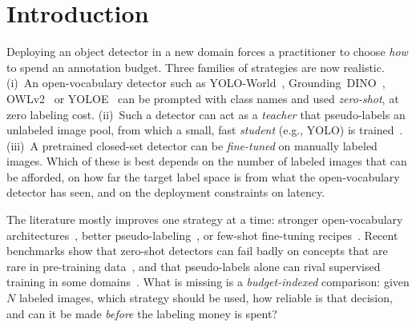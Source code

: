 \documentclass[conference]{IEEEtran}
\begin{document}
\section{Introduction}
Deploying an object detector in a new domain forces a practitioner to choose \emph{how} to spend an annotation budget. Three families of strategies are now realistic. (i)~An open-vocabulary detector such as YOLO-World~\cite{cheng2024yoloworld}, Grounding~DINO~\cite{liu2024groundingdino}, OWLv2~\cite{minderer2023owlv2} or YOLOE~\cite{wang2025yoloe} can be prompted with class names and used \emph{zero-shot}, at zero labeling cost. (ii)~Such a detector can act as a \emph{teacher} that pseudo-labels an unlabeled image pool, from which a small, fast \emph{student} (e.g., YOLO) is trained~\cite{son2024teacherstudent,xin2024dart}. (iii)~A pretrained closed-set detector can be \emph{fine-tuned} on manually labeled images. Which of these is best depends on the number of labeled images that can be afforded, on how far the target label space is from what the open-vocabulary detector has seen, and on the deployment constraints on latency.

The literature mostly improves one strategy at a time: stronger open-vocabulary architectures~\cite{cheng2024yoloworld,liu2024groundingdino,minderer2023owlv2,wang2025yoloe}, better pseudo-labeling~\cite{gao2022pseudobox,liu2021unbiased,xu2021softteacher}, or few-shot fine-tuning recipes~\cite{wang2020tfa}. Recent benchmarks show that zero-shot detectors can fail badly on concepts that are rare in pre-training data~\cite{robicheaux2025rf100vl}, and that pseudo-labels alone can rival supervised training in some domains~\cite{abid2025waste}. What is missing is a \emph{budget-indexed} comparison: given $N$ labeled images, which strategy should be used, how reliable is that decision, and can it be made \emph{before} the labeling money is spent?
\end{document}
